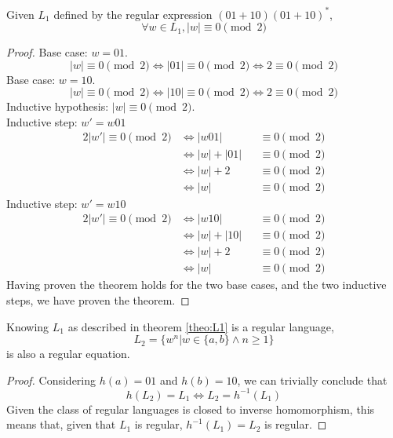 \documentclass[docid=CA06]{tcom_CA}
\begin{document}
\setcounter{chapter}{5}
{
\renewcommand{\thesubsubsection}{\thesubsection\alph{subsubsection}}
\begin{theorem}\label{theo:L1}
Given $L_1$ defined by the regular expression $(01+10)(01+10)^*$,
\begin{equation*}
	\forall w \in L_1, |w| \equiv 0 \pmod{2}
\end{equation*}
\end{theorem}
\begin{proof}
Base case: $w=01$.
\begin{equation*}
	|w| \equiv 0 \pmod{2} \iff |01| \equiv 0 \pmod{2} \iff 2 \equiv 0 \pmod{2}
\end{equation*}
Base case: $w=10$.
\begin{equation*}
	|w| \equiv 0 \pmod{2} \iff |10| \equiv 0 \pmod{2} \iff 2 \equiv 0 \pmod{2}
\end{equation*}
Inductive hypothesis: $|w| \equiv 0 \pmod{2}$.\\
Inductive step: $w'=w01$
\begin{alignat*}{2}
	|w'| \equiv 0 \pmod{2}
	&\iff |w01|    &&\equiv 0 \pmod{2}\\
	&\iff |w|+|01| &&\equiv 0 \pmod{2}\\
	&\iff |w|+2    &&\equiv 0 \pmod{2}\\
	&\iff |w|      &&\equiv 0 \pmod{2}
\end{alignat*}
Inductive step: $w'=w10$
\begin{alignat*}{2}
	|w'| \equiv 0 \pmod{2}
	&\iff |w10|    &&\equiv 0 \pmod{2}\\
	&\iff |w|+|10| &&\equiv 0 \pmod{2}\\
	&\iff |w|+2    &&\equiv 0 \pmod{2}\\
	&\iff |w|      &&\equiv 0 \pmod{2}
\end{alignat*}
Having proven the theorem holds for the two base cases, and the two inductive steps, we have proven the theorem.
\end{proof}
\begin{theorem}
	Knowing $L_1$ as described in theorem \ref{theo:L1} is a regular language,
	\begin{equation*}
		L_2 = \{w^n | w \in \{a,b\} \wedge n \geq 1 \}
	\end{equation*}
	is also a regular equation.
\end{theorem}
\begin{proof}
Considering $h(a)=01$ and $h(b)=10$, we can trivially conclude that
\begin{equation*}
	h(L_2)=L_1 \iff L_2 = h^{-1}(L_1)
\end{equation*}
Given the class of regular languages is closed to inverse homomorphism, this means that, given that $L_1$ is regular, $h^{-1}(L_1)=L_2$ is regular.
\end{proof}
}
\end{document}
